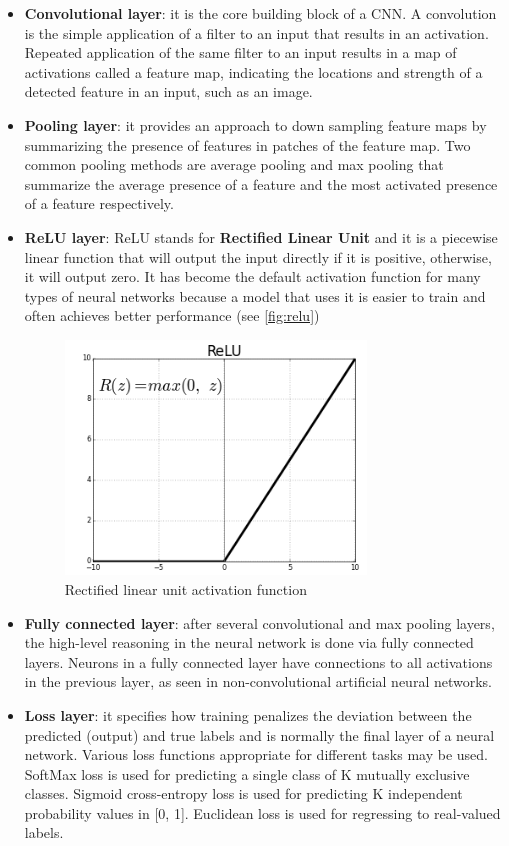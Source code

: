 \begin{itemize}
    \item \textbf{Convolutional layer}: it is the core building block of a CNN\@.
        A convolution is the simple application of a filter to an input that
        results in an activation. Repeated application of the same filter to an
        input results in a map of activations called a feature map, indicating
        the locations and strength of a detected feature in an input, such as
        an image.
    \item \textbf{Pooling layer}: it provides an approach to down sampling
        feature maps by summarizing the presence of features in patches of the
        feature map. Two common pooling methods are average pooling and max
        pooling that summarize the average presence of a feature and the most
        activated presence of a feature respectively.
    \item \textbf{ReLU layer}: ReLU stands for \textbf{Rectified Linear Unit}
        and it is a piecewise linear function that will output the input
        directly if it is positive, otherwise, it will output zero. It has
        become the default activation function for many types of neural
        networks because a model that uses it is easier to train and often
        achieves better performance (see \autoref{fig:relu})
\begin{figure}[ht]
    \includegraphics[width=8cm]{images/pruning/relu.png}
    \centering
    \caption{Rectified linear unit activation function}\label{fig:relu}
\end{figure}
    \item \textbf{Fully connected layer}: after several convolutional and max
        pooling layers, the high-level reasoning in the neural network is done
        via fully connected layers. Neurons in a fully connected layer have
        connections to all activations in the previous layer, as seen in
        non-convolutional artificial neural networks.
    \item \textbf{Loss layer}: it specifies how training penalizes the
        deviation between the predicted (output) and true labels and is
        normally the final layer of a neural network. Various loss functions
        appropriate for different tasks may be used. SoftMax loss is used for
        predicting a single class of K mutually exclusive classes.
        Sigmoid cross-entropy loss is used for predicting K independent
        probability values in [0, 1]. Euclidean loss is used for regressing to
        real-valued labels.\cite{cnn}
\end{itemize}

